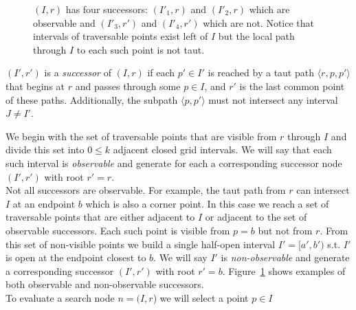 \begin{figure}[tb]
  \begin{center}
    
  \end{center}
  \caption{$(I, r)$ has four successors: $(I'_1, r)$ and $(I'_2,r)$ which are observable and $(I'_3, r')$ and $(I'_4, r')$ which are not. Notice that intervals of traversable points exist left of $I$ but the local path through $I$ to each such point is not taut.}
\label{fig::successors}
\end{figure}

\begin{defi}
\label{defi::successors}
$(I', r')$ is a \emph{successor} of
$(I, r)$ if each $p' \in I'$ is reached
by a taut path $\langle r, p,  p' \rangle$ that begins
at $r$ and passes through some $p \in I$, 
and $r'$ is the last common point of these paths.  Additionally, 
the subpath $\langle p, p' \rangle$ must not intersect any 
interval $J \neq I'$.
\end{defi}
We begin with the set of traversable points that are 
visible from $r$ through $I$ and divide this set into $0 \leq k$
adjacent closed grid intervals.
We will say that each such interval is \emph{observable} and 
generate for each a corresponding successor node 
$(I', r')$ with root $r' = r$.
\\
Not all successors are observable.
For example, the taut path from $r$ can intersect 
$I$ at an endpoint $b$ which is also a corner point.
In this case we reach a set of traversable points that 
are either adjacent to $I$ or adjacent to the set of 
observable successors.
Each such point is visible from $p = b$ but not 
from $r$.  From this set of non-visible points we build a 
single half-open interval $I' = [a', b')$ s.t. $I'$ is open at the 
endpoint closest to $b$.
We will say $I'$ is \emph{non-observable} and generate a 
corresponding successor $(I', r')$ with root $r' = b$.  
Figure~\ref{fig::successors} shows examples of both
observable and non-observable successors.
%
\\
To evaluate a search node $n = (I, r$) we will select a point $p \in I$ 
